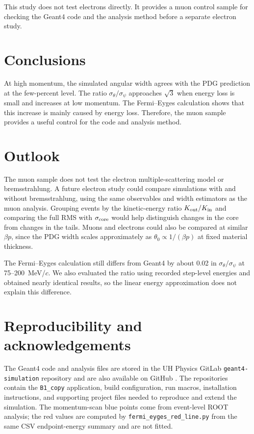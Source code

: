 \documentclass[10pt,letterpaper]{article}
\begin{document}
This study does not test electrons directly. It provides a muon control sample
for checking the Geant4 code and the analysis method before a separate electron
study.

\section{Conclusions}

At high momentum, the simulated angular width agrees with the PDG prediction
at the few-percent level. The ratio $\sigma_\theta/\sigma_\psi$ approaches $\sqrt{3}$
when energy loss is small and increases at low momentum. The Fermi--Eyges
calculation shows that this increase is mainly caused by energy loss. Therefore,
the muon sample provides a useful control for the code and analysis method.

\section{Outlook}
The muon sample does not test the electron multiple-scattering model or
bremsstrahlung. A future electron study could compare simulations with and
without bremsstrahlung, using the same observables and width estimators as
the muon analysis. Grouping events by the kinetic-energy ratio
$K_{\rm out}/K_{\rm in}$ and comparing the full RMS with $\sigma_{\rm core}$
would help distinguish changes in the core from changes in the tails.
Muons and electrons could also be compared at similar $\beta p$, since
the PDG width scales approximately as $\theta_0 \propto 1/(\beta p)$
at fixed material thickness.

The Fermi--Eyges calculation still differs from Geant4 by about 0.02 in
$\sigma_\theta/\sigma_\psi$ at 75--200~MeV/$c$. We also evaluated the ratio
using recorded step-level energies and obtained nearly identical results,
so the linear energy approximation does not explain this difference.

\section*{Reproducibility and acknowledgements}

The Geant4 code and analysis files are stored in the UH Physics GitLab
\texttt{geant4-simulation} repository and are also available on GitHub
\cite{Repository}. The repositories contain the
\texttt{B1\_copy} application, build configuration, run macros, installation
instructions, and supporting project files needed to reproduce and extend the
simulation. The momentum-scan blue points come from event-level ROOT analysis;
the red values are computed by
\texttt{fermi\_eyges\_red\_line.py} from the same CSV endpoint-energy summary
and are not fitted.
\end{document}
